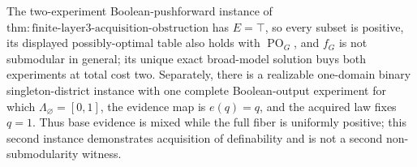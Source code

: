 The two-experiment Boolean-pushforward instance of \(\mathrm{thm:finite\text{-}layer3\text{-}acquisition\text{-}obstruction}\) has \(E=\top\), so every subset is positive, its displayed possibly-optimal table also holds with \(\operatorname{PO}_G\), and \(f_G\) is not submodular in general; its unique exact broad-model solution buys both experiments at total cost two.  Separately, there is a realizable one-domain binary singleton-district instance with one complete Boolean-output experiment for which \(\Lambda_{\varnothing}=[0,1]\), the evidence map is \(e(q)=q\), and the acquired law fixes \(q=1\).  Thus base evidence is mixed while the full fiber is uniformly positive; this second instance demonstrates acquisition of definability and is not a second non-submodularity witness.
